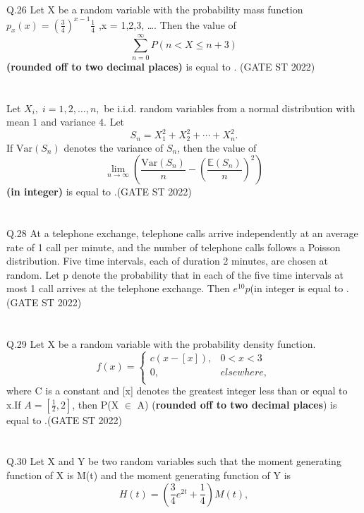 \documentclass[journal,12pt,onecolumn]{IEEEtran}
\theoremstyle{remark}
\begin{document}
\\
Q.26 Let X be a random variable with the probability mass function $p_x(x) = (\frac{3}{4})^{x-1}\frac{1}{4}$ ,x = 1,2,3, \dots. Then the value of \[ \sum_{n=0}^{\infty}P(n < X \leq n + 3)
\]
\textbf{(rounded off to two decimal places)} is equal to \underline{\hspace{2cm}} . \hfill (GATE ST 2022)\\
\\
\\
Let $X_i, \; i = 1, 2, \ldots, n,$ be i.i.d. random variables from a normal distribution 
with mean $1$ and variance $4$. Let 
\[
S_n = X_1^2 + X_2^2 + \cdots + X_n^2.
\]
If $\mathrm{Var}(S_n)$ denotes the variance of $S_n$, then the value of
\[
\lim_{n \to \infty} 
\left(
\frac{\mathrm{Var}(S_n)}{n} 
- 
\left(\frac{\mathbb{E}(S_n)}{n}\right)^2
\right)
\]
\textbf{(in integer)} is equal to \underline{\hspace{2cm}} .\hfill (GATE ST 2022)\\
\\
\\
Q.28 At a telephone exchange, telephone calls arrive independently at an average rate of
1 call per minute, and the number of telephone calls follows a Poisson distribution.
Five time intervals, each of duration 2 minutes, are chosen at random. Let p denote
the probability that in each of the five time intervals at most 1 call arrives at the
telephone exchange. Then $e^{10}p$(in integer is equal to \underline{\hspace{2cm}}.\hfill (GATE ST 2022)\\
\\
\\
Q.29 Let X be a random variable with the probability density function.\\
\[ 
f(x) = \begin{cases}
	c(x - [x]), &  0 < x < 3 \\
	0, & elsewhere,\\
	\end{cases}
\]
where C is a constant and [x] denotes the greatest integer less than or equal to x.If $A = [\frac{1}{2},2]$, then P(X $\in$ A) (\textbf{rounded off to two decimal  places}) is equal to \underline{\hspace{2cm}}.\hfill (GATE ST 2022)\\
\\
\\
Q.30 Let X and Y be two random variables such that the moment generating function of X is M(t) and the moment generating function of Y is \[
H(t) = \left( \frac{3}{4} e^{2t} + \frac{1}{4} \right) M(t),
\]
\end{document}
